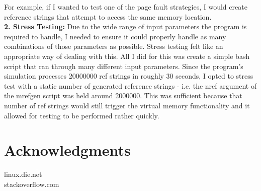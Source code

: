\documentclass{article}
\begin{document}
\noindent
For example, if I wanted to test one of the page fault strategies,
I would create reference strings that attempt to access the same memory location. \\

\noindent
\textbf{2. Stress Testing:}
Due to the wide range of input parameters the program is required to handle, I needed
to ensure it could properly handle as many combinations of those parameters as possible.
Stress testing felt like an appropriate way of dealing with this.
All I did for this was create a simple bash script that ran through many different input
parameters. Since the program's simulation processes 20000000 ref strings in roughly
30 seconds, I opted to stress test with a static number of generated reference strings -
i.e. the nref argument of the mrefgen script was held around 2000000. This was sufficient
because that number of ref strings would still trigger the virtual memory functionality
and it allowed for testing to be performed rather quickly. \\

\section{Acknowledgments}
linux.die.net \\
stackoverflow.com
\end{document}
